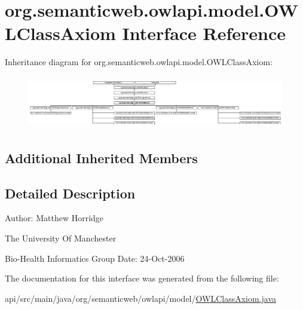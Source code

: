 \hypertarget{interfaceorg_1_1semanticweb_1_1owlapi_1_1model_1_1_o_w_l_class_axiom}{\section{org.\-semanticweb.\-owlapi.\-model.\-O\-W\-L\-Class\-Axiom Interface Reference}
\label{interfaceorg_1_1semanticweb_1_1owlapi_1_1model_1_1_o_w_l_class_axiom}
}
Inheritance diagram for org.\-semanticweb.\-owlapi.\-model.\-O\-W\-L\-Class\-Axiom\-:\begin{figure}[H]
\begin{center}
\leavevmode
\includegraphics[height=2.326870cm]{interfaceorg_1_1semanticweb_1_1owlapi_1_1model_1_1_o_w_l_class_axiom}
\end{center}
\end{figure}
\subsection*{Additional Inherited Members}


\subsection{Detailed Description}
Author\-: Matthew Horridge\par
 The University Of Manchester\par
 Bio-\/\-Health Informatics Group Date\-: 24-\/\-Oct-\/2006 

The documentation for this interface was generated from the following file\-:\begin{DoxyCompactItemize}
\item 
api/src/main/java/org/semanticweb/owlapi/model/\hyperlink{_o_w_l_class_axiom_8java}{O\-W\-L\-Class\-Axiom.\-java}\end{DoxyCompactItemize}
